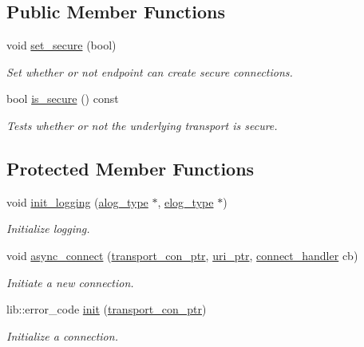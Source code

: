 \subsection*{Public Member Functions}
\begin{DoxyCompactItemize}
\item 
void \hyperlink{classwebsocketpp_1_1transport_1_1debug_1_1endpoint_aa93a1b98a940de00aadd784b3c058aa6}{set\+\_\+secure} (bool)
\begin{DoxyCompactList}\small\item\em Set whether or not endpoint can create secure connections. \end{DoxyCompactList}\item 
bool \hyperlink{classwebsocketpp_1_1transport_1_1debug_1_1endpoint_a5d9e2b3f36fda6cfbc7b2a8c514ccaa2}{is\+\_\+secure} () const
\begin{DoxyCompactList}\small\item\em Tests whether or not the underlying transport is secure. \end{DoxyCompactList}\end{DoxyCompactItemize}
\subsection*{Protected Member Functions}
\begin{DoxyCompactItemize}
\item 
void \hyperlink{classwebsocketpp_1_1transport_1_1debug_1_1endpoint_a548d0865fa00469d9ab78daa9ad25c3a}{init\+\_\+logging} (\hyperlink{classwebsocketpp_1_1transport_1_1debug_1_1endpoint_ab2b8a06c2ba2a9ae26def00aefcbc930}{alog\+\_\+type} $\ast$, \hyperlink{classwebsocketpp_1_1transport_1_1debug_1_1endpoint_a3616bf82ba2a1026fad9de8145bd9375}{elog\+\_\+type} $\ast$)
\begin{DoxyCompactList}\small\item\em Initialize logging. \end{DoxyCompactList}\item 
void \hyperlink{classwebsocketpp_1_1transport_1_1debug_1_1endpoint_a8b5c3265ebf3bf68af57f2d770950edb}{async\+\_\+connect} (\hyperlink{classwebsocketpp_1_1transport_1_1debug_1_1endpoint_ab261a090fca072aea9b5dba04aba4c6d}{transport\+\_\+con\+\_\+ptr}, \hyperlink{namespacewebsocketpp_aae370ea5ac83a8ece7712cb39fc23f5b}{uri\+\_\+ptr}, \hyperlink{namespacewebsocketpp_1_1transport_ac392fca34e946b48414278c0c3addfa5}{connect\+\_\+handler} cb)
\begin{DoxyCompactList}\small\item\em Initiate a new connection. \end{DoxyCompactList}\item 
lib\+::error\+\_\+code \hyperlink{classwebsocketpp_1_1transport_1_1debug_1_1endpoint_a23affe0618e70a665369fe273f2b534b}{init} (\hyperlink{classwebsocketpp_1_1transport_1_1debug_1_1endpoint_ab261a090fca072aea9b5dba04aba4c6d}{transport\+\_\+con\+\_\+ptr})
\begin{DoxyCompactList}\small\item\em Initialize a connection. \end{DoxyCompactList}\end{DoxyCompactItemize}


